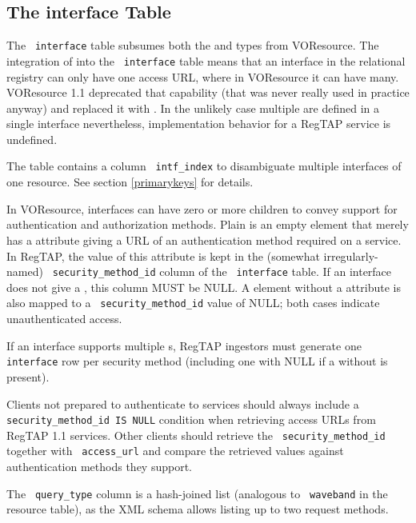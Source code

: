 \documentclass[11pt,a4paper]{ivoa}
\newcommand{\rtent}[1]{\texttt{\color{rtcolor} #1}}
\begin{document}
\subsection{The interface Table}

\label{table_interface}

The \rtent{interface} table subsumes both the
 and  types from
VOResource.  The integration of   into
the \rtent{interface}  table means that an interface in the
relational registry can only have one access URL, where in VOResource it
can have many.  VOResource 1.1 deprecated that capability (that was
never really used in practice anyway) and replaced it with
.
In the unlikely case multiple  are defined in a single
interface nevertheless, implementation behavior for a RegTAP service is
undefined.

The table contains a column \rtent{intf\_index} to disambiguate
multiple interfaces of one resource. See section \ref{primarykeys} for details.

In VOResource, interfaces can have zero or more 
children to convey support for authentication and authorization methods.
Plain  is an empty element that merely has a
 attribute giving a URL of an authentication method
required on a service.  In RegTAP, the value of
this attribute is kept in the (somewhat irregularly-named)
\rtent{security\_method\_id} column of the \rtent{interface} table.  If
an interface does not give a , this column MUST
be NULL.  A  element without a 
attribute is also mapped to a \rtent{security\_method\_id} value of
NULL; both cases indicate unauthenticated access.

If an interface supports multiple s, RegTAP
ingestors must generate one \rtent{interface} row per security method
(including one with NULL if a  without
 is present).

Clients not prepared to authenticate to services should always include a
\verb|security_method_id IS NULL| condition when retrieving access URLs
from RegTAP 1.1 services.  Other clients should retrieve the
\rtent{security\_method\_id} together with \rtent{access\_url} and
compare the retrieved values against authentication methods they
support.

The \rtent{query\_type} column is a hash-joined list (analogous
to \rtent{waveband} in the resource table), as
the XML schema allows listing up to two request methods.
\end{document}
